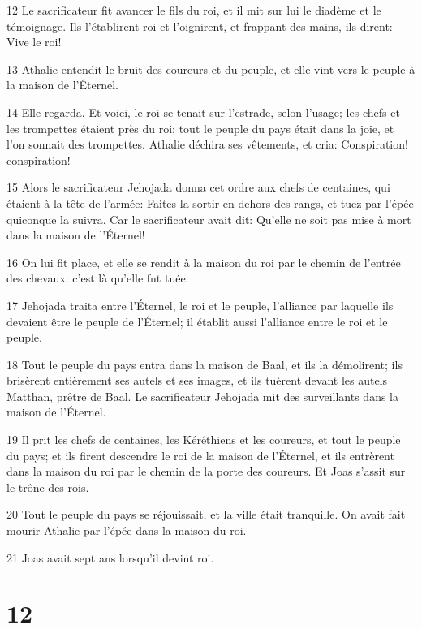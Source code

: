 \par 12 Le sacrificateur fit avancer le fils du roi, et il mit sur lui le diadème et le témoignage. Ils l'établirent roi et l'oignirent, et frappant des mains, ils dirent: Vive le roi!
\par 13 Athalie entendit le bruit des coureurs et du peuple, et elle vint vers le peuple à la maison de l'Éternel.
\par 14 Elle regarda. Et voici, le roi se tenait sur l'estrade, selon l'usage; les chefs et les trompettes étaient près du roi: tout le peuple du pays était dans la joie, et l'on sonnait des trompettes. Athalie déchira ses vêtements, et cria: Conspiration! conspiration!
\par 15 Alors le sacrificateur Jehojada donna cet ordre aux chefs de centaines, qui étaient à la tête de l'armée: Faites-la sortir en dehors des rangs, et tuez par l'épée quiconque la suivra. Car le sacrificateur avait dit: Qu'elle ne soit pas mise à mort dans la maison de l'Éternel!
\par 16 On lui fit place, et elle se rendit à la maison du roi par le chemin de l'entrée des chevaux: c'est là qu'elle fut tuée.
\par 17 Jehojada traita entre l'Éternel, le roi et le peuple, l'alliance par laquelle ils devaient être le peuple de l'Éternel; il établit aussi l'alliance entre le roi et le peuple.
\par 18 Tout le peuple du pays entra dans la maison de Baal, et ils la démolirent; ils brisèrent entièrement ses autels et ses images, et ils tuèrent devant les autels Matthan, prêtre de Baal. Le sacrificateur Jehojada mit des surveillants dans la maison de l'Éternel.
\par 19 Il prit les chefs de centaines, les Kéréthiens et les coureurs, et tout le peuple du pays; et ils firent descendre le roi de la maison de l'Éternel, et ils entrèrent dans la maison du roi par le chemin de la porte des coureurs. Et Joas s'assit sur le trône des rois.
\par 20 Tout le peuple du pays se réjouissait, et la ville était tranquille. On avait fait mourir Athalie par l'épée dans la maison du roi.
\par 21 Joas avait sept ans lorsqu'il devint roi.

\chapter{12}

